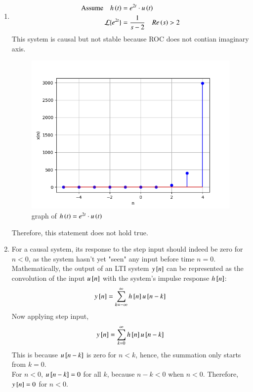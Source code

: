 \documentclass[journal,12pt,twocolumn]{IEEEtran}
\theoremstyle{remark}
\begin{document}
\begin{enumerate}
    \item
    \begin{align}
        \text{Assume}\quad h\left(t\right)&=e^{2t}\cdot u\left(t\right)\\
        \mathcal{L}\{e^{2t}\} &= \frac{1}{s-2}\quad Re\left(s\right)>2
    \end{align}
    This system is causal but not stable because ROC does not contian imaginary axis.
    
    \begin{figure}[ht]
    \renewcommand\thefigure{1}
        \centering
        \includegraphics[width=0.8\linewidth]{figs/graph31.png}
        \caption{graph of $h\left(t\right) = e^{2t}\cdot u\left(t\right)$}
    \end{figure}
    Therefore, this statement does not hold true.
    \item
    For a causal system, its response to the step input should indeed be zero for $n<0$, as the system hasn't yet "seen" any input before time $n=0$.\\
    Mathematically, the output of an LTI system $y{}\left[n\right]$ can be represented as the convolution of the input $u{}\left[n\right]$ with the system's impulse response $h{}\left[n\right]$:\\
    \begin{align}
        y{}\left[n\right]=\sum_{k=-\infty}^{\infty}h{}\left[n\right]u{}\left[n-k\right]
    \end{align}
    Now applying step input,
    \begin{align}
        y{}\left[n\right]=\sum_{k=0}^{\infty}h{}\left[n\right]u{}\left[n-k\right]
    \end{align}
    This is because $u{}\left[n-k\right]$ is zero for $n<k$, hence, the summation only starts from $k=0$.\\
    For $n<0$, $u{}\left[n-k\right]=0$ for all $k$, because $n-k<0$ when $n<0$. Therefore, $y{}\left[n\right]=0$ for $n<0$.


\end{enumerate}
\end{document}
